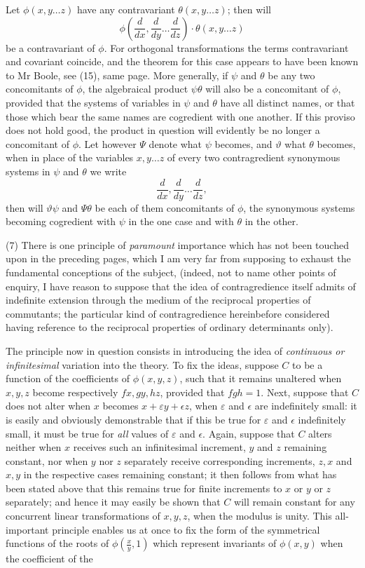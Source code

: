 \documentclass[11pt]{article}
\newcommand{\sourcepage}[1]{\marginpar{\scriptsize p.~#1}}
\begin{document}
\sourcepage{326}
Let $\phi(x,y\ldots z)$ have any contravariant $\theta(x,y\ldots z)$; then will
\[
\phi\left(\frac{d}{dx},\frac{d}{dy}\ldots\frac{d}{dz}\right)\cdot\theta(x,y\ldots z)
\]
be a contravariant of $\phi$. For orthogonal transformations the terms contravariant and covariant coincide, and the theorem for this case appears to have been known to Mr Boole, see (15), same page. More generally, if $\psi$ and $\theta$ be any two concomitants of $\phi$, the algebraical product $\psi\theta$ will also be a concomitant of $\phi$, provided that the systems of variables in $\psi$ and $\theta$ have all distinct names, or that those which bear the same names are cogredient with one another. If this proviso does not hold good, the product in question will evidently be no longer a concomitant of $\phi$. Let however $\Psi$ denote what $\psi$ becomes, and $\vartheta$ what $\theta$ becomes, when in place of the variables $x,y\ldots z$ of every two contragredient synonymous systems in $\psi$ and $\theta$ we write
\[
\frac{d}{dx},\frac{d}{dy}\ldots\frac{d}{dz},
\]
then will $\vartheta\psi$ and $\Psi\theta$ be each of them concomitants of $\phi$, the synonymous systems becoming cogredient with $\psi$ in the one case and with $\theta$ in the other.

(7) There is one principle of \emph{paramount} importance which has not been touched upon in the preceding pages, which I am very far from supposing to exhaust the fundamental conceptions of the subject, (indeed, not to name other points of enquiry, I have reason to suppose that the idea of contragredience itself admits of indefinite extension through the medium of the reciprocal properties of commutants; the particular kind of contragredience hereinbefore considered having reference to the reciprocal properties of ordinary determinants only).

The principle now in question consists in introducing the idea of \emph{continuous or infinitesimal} variation into the theory. To fix the ideas, suppose $C$ to be a function of the coefficients of $\phi(x,y,z)$, such that it remains unaltered when $x,y,z$ become respectively $fx,gy,hz$, provided that $fgh=1$. Next, suppose that $C$ does not alter when $x$ becomes $x+\varepsilon y+\epsilon z$, when $\varepsilon$ and $\epsilon$ are indefinitely small: it is easily and obviously demonstrable that if this be true for $\varepsilon$ and $\epsilon$ indefinitely small, it must be true for \emph{all} values of $\varepsilon$ and $\epsilon$. Again, suppose that $C$ alters neither when $x$ receives such an infinitesimal increment, $y$ and $z$ remaining constant, nor when $y$ nor $z$ separately receive corresponding increments, $z,x$ and $x,y$ in the respective cases remaining constant; it then follows from what has been stated above that this remains true for finite increments to $x$ or $y$ or $z$ separately; and hence it may easily be shown that $C$ will remain constant for any concurrent linear transformations of $x,y,z$, when the modulus is unity. This all-important principle enables us at once to fix the form of the symmetrical functions of the roots of $\phi\left(\frac{x}{y},1\right)$ which represent invariants of $\phi(x,y)$ when the coefficient of the
\end{document}
